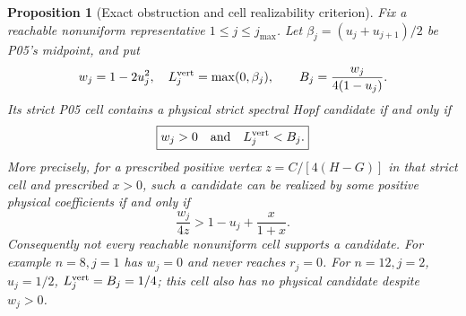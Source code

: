 \documentclass[11pt]{article}
\newtheorem{proposition}[theorem]{Proposition}
\theoremstyle{definition}
\theoremstyle{remark}
\begin{document}
\begin{proposition}[Exact obstruction and cell realizability criterion]
\label{prop:P11-realizability}
Fix a reachable nonuniform representative $1\le j\le j_{\max}$.
Let $\beta_j=(u_j+u_{j+1})/2$ be P05's midpoint, and put
\begin{equation}
 w_j=1-2u_j^2,\quad L_j^{\rm vert}=\max(0,\beta_j),\qquad
 B_j=\frac{w_j}{4(1-u_j)}.
 \label{eq:P11-realizability-data}
\end{equation}
Its strict P05 cell contains a physical strict spectral Hopf candidate
if and only if
\begin{equation}
 \boxed{w_j>0\quad\hbox{and}\quad L_j^{\rm vert}<B_j.}
 \label{eq:P11-realizability-test}
\end{equation}
More precisely, for a prescribed positive vertex
$z=C/[4(H-G)]$ in that strict cell and prescribed $x>0$, such a
candidate can be realized by some positive physical coefficients if
and only if
\begin{equation}
 \frac{w_j}{4z}>1-u_j+\frac{x}{1+x}.
 \label{eq:P11-fixed-vertex}
\end{equation}
Consequently not every reachable nonuniform cell supports a candidate.
For example $n=8,j=1$ has $w_j=0$ and never reaches $r_j=0$.
For $n=12,j=2$, $u_j=1/2$, $L_j^{\rm vert}=B_j=1/4$;
this cell also has no physical candidate despite $w_j>0$.
\end{proposition}
\end{document}
